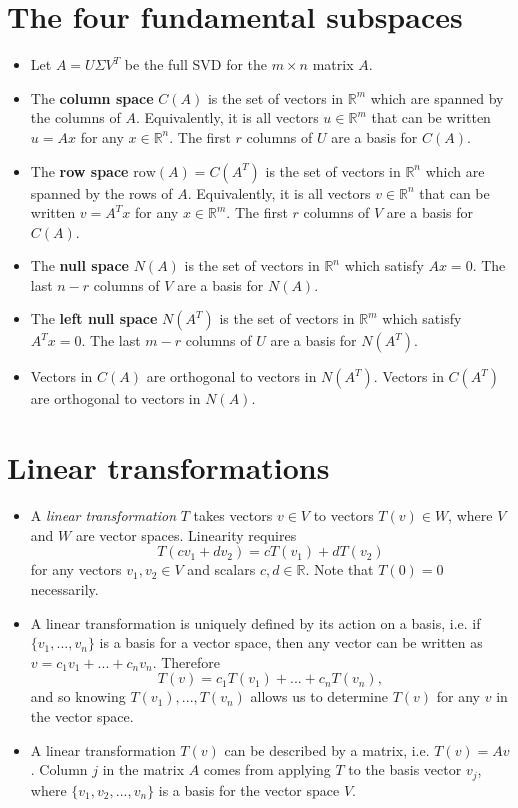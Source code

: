 \documentclass[11pt]{article}
\begin{document}
\section{The four fundamental subspaces}
\begin{itemize}
\item Let $A=U\Sigma V^T$ be the full SVD for the $m\times n$ matrix $A$. 
\item The \textbf{column space} $C(A)$ is the set of vectors in $\mathbb{R}^m$ which are spanned by the columns of $A$. Equivalently, it is all vectors $u\in\mathbb{R}^m$ that can be written $u=Ax$ for any $x\in\mathbb{R}^n$. The first $r$ columns of $U$ are a basis for $C(A)$.
\item The \textbf{row space} $\text{row}(A)=C(A^T)$ is the set of vectors in $\mathbb{R}^n$ which are spanned by the rows of $A$. Equivalently, it is all vectors $v\in\mathbb{R}^n$ that can be written $v=A^Tx$ for any $x\in\mathbb{R}^m$. The first $r$ columns of $V$ are a basis for $C(A)$.
\item The \textbf{null space} $N(A)$ is the set of vectors in $\mathbb{R}^n$ which satisfy $Ax = 0$. The last $n-r$ columns of $V$ are a basis for $N(A)$.
\item The \textbf{left null space} $N(A^T)$ is the set of vectors in $\mathbb{R}^m$ which satisfy $A^Tx=0$. The last $m-r$ columns of $U$ are a basis for $N(A^T)$.
\item Vectors in $C(A)$ are orthogonal to vectors in $N(A^T)$. Vectors in $C(A^T)$ are orthogonal to vectors in $N(A)$. 
\end{itemize}

\newpage

\section{Linear transformations}
\begin{itemize}
\item A \emph{linear transformation} $T$ takes vectors $v\in V$ to vectors $T(v)\in W$, where $V$ and $W$ are vector spaces. Linearity requires
$$\boxed{T(cv_1+dv_2) = cT(v_1) + dT(v_2)}$$
for any vectors $v_1, v_2 \in V$ and scalars $c,d \in \mathbb{R}$. Note that $T(0)=0$ necessarily.
\item A linear transformation is uniquely defined by its action on a basis, i.e. if $\{v_1,...,v_n\}$ is a basis for a vector space, then any vector can be written as $v=c_1v_1 + ... + c_nv_n$. Therefore 
$$T(v) = c_1T(v_1)+...+c_nT(v_n),$$
and so knowing $T(v_1),..., T(v_n)$ allows us to determine $T(v)$ for any $v$ in the vector space.
\item A linear transformation $T(v)$ can be described by a matrix, i.e. $T(v) = Av$. Column $j$ in the matrix $A$ comes from applying $T$ to the basis vector $v_j$, where $\{v_1,v_2, ... , v_n\}$ is a basis for the vector space $V$. 
\end{itemize}
\end{document}
